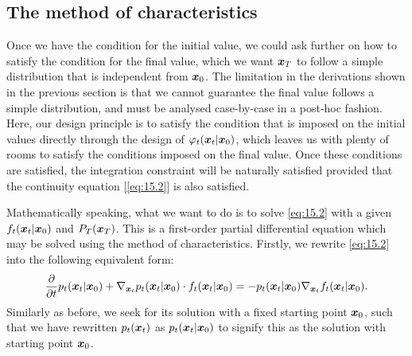 \subsection{The method of characteristics}

Once we have the condition for the initial value, we could ask further on how to satisfy the condition for the final value, which we want $\bm{x}_T$ to follow a simple distribution that is independent from $\bm{x}_0$. The limitation in the derivations shown in the previous section is that we cannot guarantee the final value follows a simple distribution, and must be analysed case-by-case in a post-hoc fashion. Here, our design principle is to satisfy the condition that is imposed on the initial values directly through the design of $\varphi_t(\bm{x}_{t}|\bm{x}_0)$, which leaves us with plenty of rooms to satisfy the conditions imposed on the final value. Once these conditions are satisfied, the integration constraint will be naturally satisfied provided that the continuity equation [\cref{eq:15.2}] is also satisfied.

Mathematically speaking, what we want to do is to solve \cref{eq:15.2} with a given $f_t(\bm{x}_{t}|\bm{x}_0)$ and $P_{T}(\bm{x}_T)$. This is a first-order partial differential equation which may be solved using the method of characteristics. Firstly, we rewrite \cref{eq:15.2} into the following equivalent form:
\begin{equation}
    \label{eq:15.9}
    \frac{\partial}{\partial t}p_t(\bm{x}_{t}|\bm{x}_0)+\nabla_{\bm{x}_{t}}p_t(\bm{x}_{t}|\bm{x}_0)\cdot f_t(\bm{x}_{t}|\bm{x}_0)=-p_t(\bm{x}_{t}|\bm{x}_0) \nabla_{\bm{x}_{t}}f_t(\bm{x}_{t}|\bm{x}_0).
\end{equation}
Similarly as before, we seek for its solution with a fixed starting point $\bm{x}_0$, such that we have rewritten $p_t (\bm{x}_{t})$ as $p_t(\bm{x}_{t}|\bm{x}_0)$ to signify this as the solution with starting point $\bm{x}_0$.

